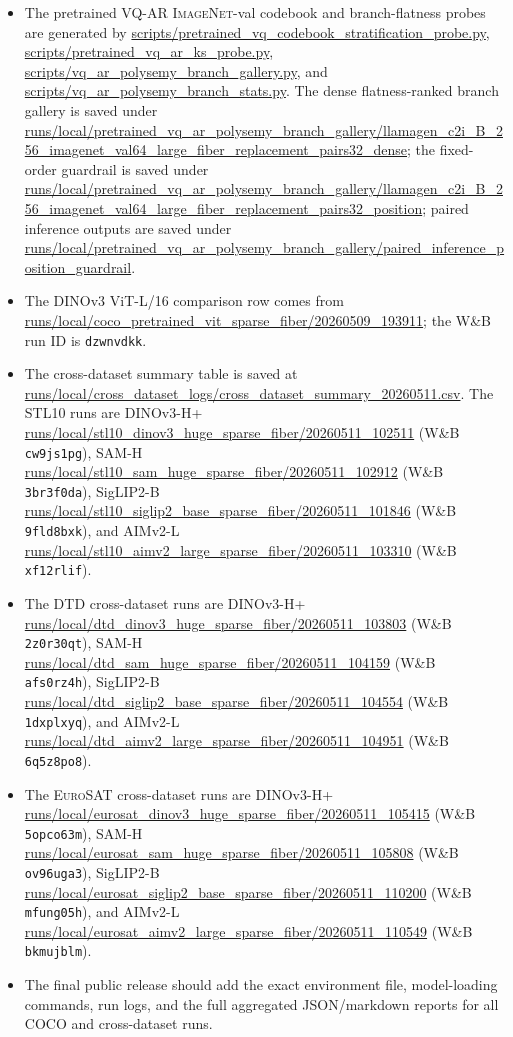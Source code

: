 \documentclass{article}
\newcommand{\dataset}[1]{\textsc{#1}}
\begin{document}
\begin{itemize}[leftmargin=1.5em]
\item The pretrained VQ-AR \dataset{ImageNet}-val codebook and branch-flatness probes are generated by \url{scripts/pretrained_vq_codebook_stratification_probe.py}, \url{scripts/pretrained_vq_ar_ks_probe.py}, \url{scripts/vq_ar_polysemy_branch_gallery.py}, and \url{scripts/vq_ar_polysemy_branch_stats.py}. The dense flatness-ranked branch gallery is saved under \url{runs/local/pretrained_vq_ar_polysemy_branch_gallery/llamagen_c2i_B_256_imagenet_val64_large_fiber_replacement_pairs32_dense}; the fixed-order guardrail is saved under \url{runs/local/pretrained_vq_ar_polysemy_branch_gallery/llamagen_c2i_B_256_imagenet_val64_large_fiber_replacement_pairs32_position}; paired inference outputs are saved under \url{runs/local/pretrained_vq_ar_polysemy_branch_gallery/paired_inference_position_guardrail}.
\item The DINOv3 ViT-L/16 comparison row comes from \url{runs/local/coco_pretrained_vit_sparse_fiber/20260509_193911}; the W\&B run ID is \texttt{dzwnvdkk}.
\item The cross-dataset summary table is saved at \url{runs/local/cross_dataset_logs/cross_dataset_summary_20260511.csv}. The \dataset{STL10} runs are DINOv3-H+ \url{runs/local/stl10_dinov3_huge_sparse_fiber/20260511_102511} (W\&B \texttt{cw9js1pg}), SAM-H \url{runs/local/stl10_sam_huge_sparse_fiber/20260511_102912} (W\&B \texttt{3br3f0da}), SigLIP2-B \url{runs/local/stl10_siglip2_base_sparse_fiber/20260511_101846} (W\&B \texttt{9fld8bxk}), and AIMv2-L \url{runs/local/stl10_aimv2_large_sparse_fiber/20260511_103310} (W\&B \texttt{xf12rlif}).
\item The \dataset{DTD} cross-dataset runs are DINOv3-H+ \url{runs/local/dtd_dinov3_huge_sparse_fiber/20260511_103803} (W\&B \texttt{2z0r30qt}), SAM-H \url{runs/local/dtd_sam_huge_sparse_fiber/20260511_104159} (W\&B \texttt{afs0rz4h}), SigLIP2-B \url{runs/local/dtd_siglip2_base_sparse_fiber/20260511_104554} (W\&B \texttt{1dxplxyq}), and AIMv2-L \url{runs/local/dtd_aimv2_large_sparse_fiber/20260511_104951} (W\&B \texttt{6q5z8po8}).
\item The \dataset{EuroSAT} cross-dataset runs are DINOv3-H+ \url{runs/local/eurosat_dinov3_huge_sparse_fiber/20260511_105415} (W\&B \texttt{5opco63m}), SAM-H \url{runs/local/eurosat_sam_huge_sparse_fiber/20260511_105808} (W\&B \texttt{ov96uga3}), SigLIP2-B \url{runs/local/eurosat_siglip2_base_sparse_fiber/20260511_110200} (W\&B \texttt{mfung05h}), and AIMv2-L \url{runs/local/eurosat_aimv2_large_sparse_fiber/20260511_110549} (W\&B \texttt{bkmujblm}).
\item The final public release should add the exact environment file, model-loading commands, run logs, and the full aggregated JSON/markdown reports for all \dataset{COCO} and cross-dataset runs.
\end{itemize}


\end{document}
